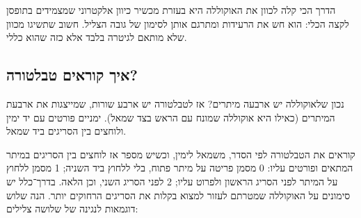 הדרך הכי קלה לכוון את האוקוללה היא בעזרת מכשיר כיוון אלקטרוני שמצמידים בתופסן לקצה הכלי: הוא חש את הרעידות ומתרגם אותן לסימון של גובה הצליל. חשוב שתשיגו מכוון שלא מותאם לגיטרה בלבד אלא כזה שהוא כללי.



\subsection*{איך קוראים טבלטורה?}

נכון שלאוקוללה יש ארבעה מיתרים? אז לטבלטורה יש ארבע שורות, שמייצגות את ארבעת המיתרים (כאילו היא אוקוללה שמונח עם הראש בצד שמאל). ימניים פורטים עם יד ימין ולוחצים בין הסריגים ביד שמאל.

קוראים את הטבלטורה לפי הסדר, משמאל לימין, וכשיש מספר אז לוחצים בין הסריגים במיתר המתאים ופורטים עליו: 0 מסמן פריטה על מיתר פתוח, בלי ללחוץ ביד השניה; 1 מסמן ללחוץ על המיתר לפני הסריג הראשון ולפרוט עליו; 2 לפני הסריג השני, וכן הלאה. בדרך־כלל יש סימונים על האוקוללה שמטרתם לעזור למצוא בקלות את הסריגים הרחוקים יותר. הנה שלוש דוגמאות לנגינה של שלושה צלילים:

